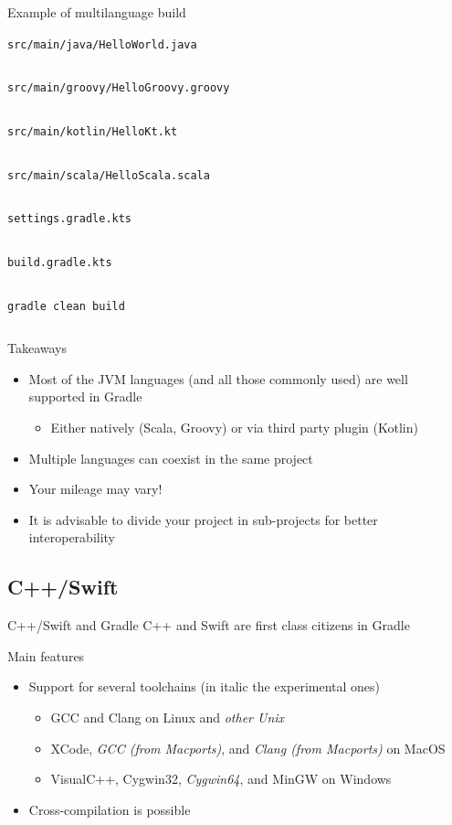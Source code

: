 \documentclass[presentation]{beamer}
\newcommand{\codefile}[4]{
	\begin{block}{\texttt{#2}}
		\inputminted[fontsize=#3,linenos=true,breaklines=true]{#4}{"workspace/#1/#2"}
	\end{block}
}
\newcommand{\java}[3]{\codefile{#1}{#2}{#3}{java}}
\newcommand{\groovy}[3]{\codefile{#1}{#2}{#3}{groovy}}
\newcommand{\kotlin}[3]{\codefile{#1}{#2}{#3}{kotlin}}
\newcommand{\scala}[3]{\codefile{#1}{#2}{#3}{scala}}
\newcommand{\terminal}[3]{\codefile{#1}{#2}{#3}{text}}
\begin{document}
\begin{frame}{Example of multilanguage build}
    \java{16-Multilang}{src/main/java/HelloWorld.java}{\normalsize}
    \groovy{16-Multilang}{src/main/groovy/HelloGroovy.groovy}{\normalsize}
    \kotlin{16-Multilang}{src/main/kotlin/HelloKt.kt}{\normalsize}
    \scala{16-Multilang}{src/main/scala/HelloScala.scala}{\normalsize}
    \kotlin{16-Multilang}{settings.gradle.kts}{\normalsize}
    \kotlin{16-Multilang}{build.gradle.kts}{\footnotesize}
    \terminal{16-Multilang}{gradle clean build}{\tiny}
    \begin{block}{Takeaways}
        \begin{itemize}
            \item Most of the JVM languages (and all those commonly used) are well supported in Gradle
            \begin{itemize}
                \item Either natively (Scala, Groovy) or via third party plugin (Kotlin)
            \end{itemize}
            \item Multiple languages can coexist in the same project
            \item Your mileage may vary!
            \item It is advisable to divide your project in sub-projects for better interoperability
        \end{itemize}
    \end{block}
\end{frame}

\subsection{C++/Swift}

\begin{frame}[fragile]{C++/Swift and Gradle}
    C++ and Swift are first class citizens in Gradle
    \begin{block}{Main features}
        \begin{itemize}
            \item Support for several toolchains (in italic the experimental ones)
            \begin{itemize}
                \item GCC and Clang on Linux and \textit{other Unix}
                \item XCode, \textit{GCC (from Macports)}, and \textit{Clang (from Macports)} on MacOS
                \item VisualC++, Cygwin32, \textit{Cygwin64}, and MinGW on Windows
            \end{itemize}
            \item Cross-compilation is possible
        \end{itemize}
    \end{block}
\end{frame}
\end{document}
